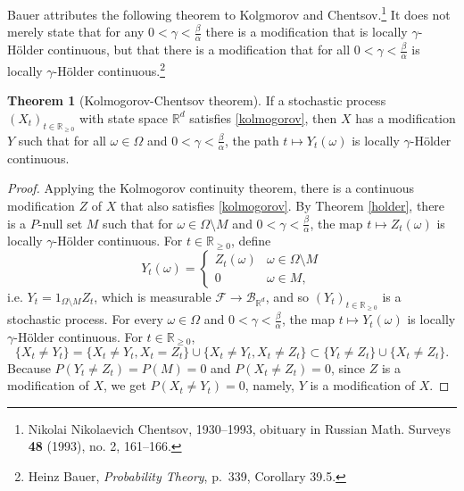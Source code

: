 \documentclass{article}
\theoremstyle{definition}
\newtheorem{theorem}{Theorem}
\theoremstyle{definition}
\begin{document}
Bauer attributes the following theorem to Kolgmorov and Chentsov.\footnote{Nikolai Nikolaevich Chentsov,
1930--1993,
 obituary in Russian Math. Surveys \textbf{48} (1993), no. 2, 161--166.}
 It does not merely state that for any
$0<\gamma<\frac{\beta}{\alpha}$ there is a modification that is locally $\gamma$-H\"older continuous, but that
there is a modification that for all $0<\gamma<\frac{\beta}{\alpha}$ is locally
$\gamma$-H\"older continuous.\footnote{Heinz Bauer, {\em Probability Theory},
p.~339, Corollary 39.5.}

\begin{theorem}[Kolmogorov-Chentsov theorem]
If a stochastic process $(X_t)_{t \in \mathbb{R}_{\geq 0}}$ with state space $\mathbb{R}^d$ satisfies \eqref{kolmogorov},
then $X$ has a modification $Y$ such that for all $\omega \in \Omega$ and $0<\gamma<\frac{\beta}{\alpha}$,
the path $t \mapsto Y_t(\omega)$ is locally $\gamma$-H\"older continuous.
\end{theorem}
\begin{proof}
Applying the Kolmogorov continuity theorem, there is a continuous modification $Z$ of $X$ that 
also satisfies \eqref{kolmogorov}. 
By Theorem \ref{holder}, there is a $P$-null set $M$ such that for 
$\omega \in \Omega \setminus M$ and $0<\gamma<\frac{\beta}{\alpha}$,
the map
$t \mapsto Z_t(\omega)$ is locally $\gamma$-H\"older continuous.
For $t \in \mathbb{R}_{\geq 0}$, define
\[
Y_t(\omega) = \begin{cases}
Z_t(\omega)&\omega \in \Omega \setminus M\\
0&\omega \in M,
\end{cases}
\]
i.e. $Y_t = 1_{\Omega \setminus M} Z_t$, which is measurable $\mathscr{F} \to \mathscr{B}_{\mathbb{R}^d}$, and so
$(Y_t)_{t \in \mathbb{R}_{\geq 0}}$ is a stochastic process. For every $\omega \in \Omega$ and $0<\gamma<\frac{\beta}{\alpha}$, the map
$t \mapsto Y_t(\omega)$ is locally $\gamma$-H\"older continuous. 
For $t \in \mathbb{R}_{\geq 0}$,
\[
\{X_t \neq Y_t\} = \{X_t \neq Y_t, X_t = Z_t\} \cup \{X_t \neq Y_t, X_t \neq Z_t\}
\subset \{Y_t \neq Z_t\} \cup \{X_t \neq Z_t\}.
\]
Because $P(Y_t \neq Z_t)=P(M)=0$ and $P(X_t \neq Z_t)=0$, since $Z$ is a modification of $X$, we get
$P(X_t \neq Y_t)=0$, namely, $Y$ is a modification of $X$.
\end{proof}
\end{document}
